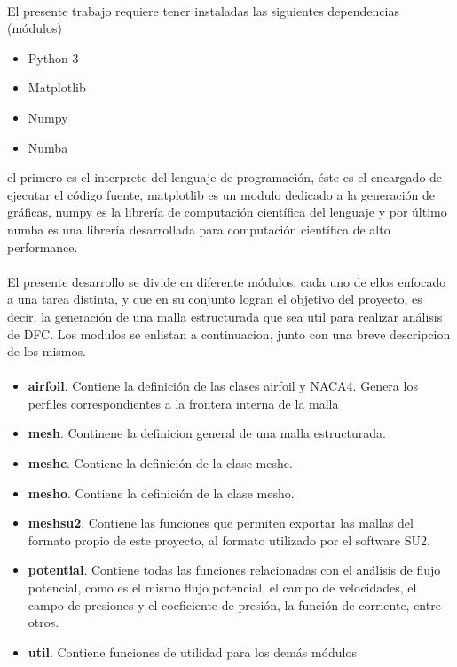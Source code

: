 \documentclass[letterpaper, openright, 12pt]{book}
\begin{document}
    \paragraph*{}
    El presente trabajo requiere tener instaladas las siguientes dependencias
    (módulos)
    \begin{itemize}
        \item Python 3
        \item Matplotlib
        \item Numpy
        \item Numba
    \end{itemize}
    el primero es el interprete del lenguaje de programación, éste es el
    encargado de ejecutar el código fuente, matplotlib es un modulo dedicado
    a la generación de gráficas, numpy es la librería de computación
    científica del lenguaje y por último numba es una librería desarrollada
    para computación científica de alto performance.

    \paragraph*{}
    El presente desarrollo se divide en diferente módulos, cada uno de ellos
    enfocado a una tarea distinta, y que en su conjunto logran el objetivo del
    proyecto, es decir, la generación de una malla estructurada que sea util
    para realizar análisis de DFC\@. Los modulos se enlistan a continuacion,
    junto con una breve descripcion de los mismos.

    \paragraph*{}
    \begin{itemize}
        \item \textbf{airfoil}. Contiene la definición de las clases airfoil y
            NACA4. Genera los perfiles correspondientes a la frontera interna
            de la malla
        \item \textbf{mesh}. Continene la definicion general de una malla estructurada.
        \item \textbf{mesh\textunderscore c}. Contiene la definición de la clase
            mesh\textunderscore c.
        \item \textbf{mesh\textunderscore o}. Contiene la definición de la clase
            mesh\textunderscore o.
        \item \textbf{mesh\textunderscore su2}. Contiene las funciones que
            permiten exportar las mallas del formato propio de este proyecto,
            al formato utilizado por el software SU2.
        \item \textbf{potential}. Contiene todas las funciones relacionadas con
            el análisis de flujo potencial, como es el mismo flujo
            potencial, el campo de velocidades, el campo de presiones y el
            coeficiente de presión, la función de corriente, entre otros.
        \item \textbf{util}. Contiene funciones de utilidad para los demás
            módulos
    \end{itemize}
\end{document}
